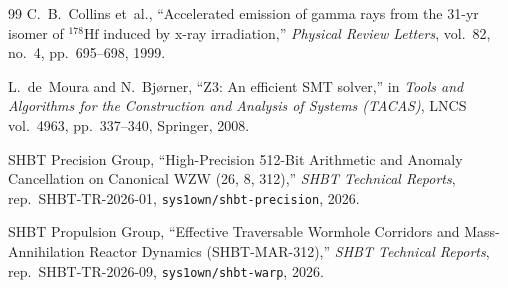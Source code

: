 \documentclass[11pt,onecolumn]{article}
\begin{document}
\begin{thebibliography}{99}
C.~B.~Collins et~al.,
``Accelerated emission of gamma rays from the 31-yr isomer of $^{178}\text{Hf}$ induced by x-ray irradiation,''
\emph{Physical Review Letters}, vol.~82, no.~4, pp.~695--698, 1999.

L.~de~Moura and N.~Bj{\o}rner,
``Z3: An efficient SMT solver,''
in \emph{Tools and Algorithms for the Construction and Analysis of Systems (TACAS)}, LNCS vol.~4963, pp.~337--340, Springer, 2008.

SHBT Precision Group,
``High-Precision 512-Bit Arithmetic and Anomaly Cancellation on Canonical WZW (26, 8, 312),''
\emph{SHBT Technical Reports}, rep.~SHBT-TR-2026-01, \texttt{sys1own/shbt-precision}, 2026.

SHBT Propulsion Group,
``Effective Traversable Wormhole Corridors and Mass-Annihilation Reactor Dynamics (SHBT-MAR-312),''
\emph{SHBT Technical Reports}, rep.~SHBT-TR-2026-09, \texttt{sys1own/shbt-warp}, 2026.
\end{thebibliography}
\end{document}

